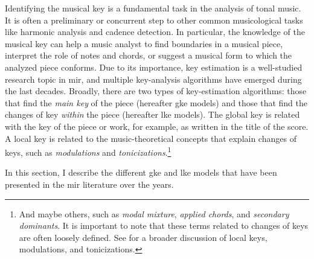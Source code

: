 

Identifying the musical key is a fundamental task in the
analysis of tonal music. It is often a preliminary or
concurrent step to other common musicological tasks like
harmonic analysis and cadence detection. In particular, the
knowledge of the musical key can help a music analyst to
find boundaries in a musical piece, interpret the role of
notes and chords, or suggest a musical form to which the
analyzed piece conforms. Due to its importance, key
estimation is a well-studied research topic in \gls{mir},
and multiple key-analysis algorithms have emerged during the
last decades. Broadly, there are two types of key-estimation
algorithms: those that find the \emph{main key} of the piece
(hereafter \gls{gke} models) and those that find the changes
of key \emph{within} the piece (hereafter \gls{lke} models).
The global key is related with the key of the piece or work,
for example, as written in the title of the score.
A local key is related to the music-theoretical concepts
that explain changes of keys, such as \emph{modulations} and
\emph{tonicizations}.\footnote{And maybe others, such as
\emph{modal mixture}, \emph{applied chords}, and
\emph{secondary dominants}. It is important to note that
these terms related to changes of keys are often loosely
defined. See \textcite{napoleslopez2020local} for a broader
discussion of local keys, modulations, and tonicizations.}

In this section, I describe the different \gls{gke} and
\gls{lke} models that have been presented in the \gls{mir}
literature over the years.
